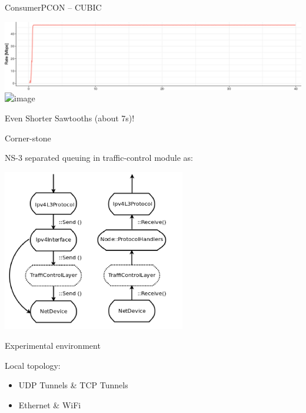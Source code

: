\begin{frame}{ConsumerPCON -- CUBIC}

\includegraphics[width=\linewidth]{figs/cons_cubic_rate.png}\\
\pause
\includegraphics<1-2>[width=\linewidth]{figs/cons_cubic_queue.png}

Even Shorter Sawtooths (about 7s)!

\end{frame}


\begin{frame}{Corner-stone}

NS-3 separated queuing in traffic-control module as:

\includegraphics[height=200pt]{figs/ns3-queue.png}
\end{frame}













\begin{frame}{Experimental environment}

Local topology:

\begin{itemize}
\item UDP Tunnels \& TCP Tunnels
\item Ethernet \& WiFi
\end{itemize}

\end{frame}

